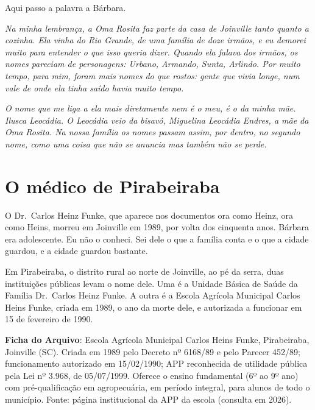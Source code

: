 \documentclass[
  brazilian,
  11pt,
  openany]{book}
\begin{document}
Aqui passo a palavra a Bárbara.

\emph{Na minha lembrança, a Oma Rosita faz parte da casa de Joinville
tanto quanto a cozinha. Ela vinha do Rio Grande, de uma família de doze
irmãos, e eu demorei muito para entender o que isso queria dizer. Quando
ela falava dos irmãos, os nomes pareciam de personagens: Urbano,
Armando, Sunta, Arlindo. Por muito tempo, para mim, foram mais nomes do
que rostos: gente que vivia longe, num vale de onde ela tinha saído
havia muito tempo.}

\emph{O nome que me liga a ela mais diretamente nem é o meu, é o da
minha mãe. Ilusca Leocádia. O Leocádia veio da bisavó, Miguelina
Leocádia Endres, a mãe da Oma Rosita. Na nossa família os nomes passam
assim, por dentro, no segundo nome, como uma coisa que não se anuncia
mas também não se perde.}

\section{O médico de Pirabeiraba}\label{o-muxe9dico-de-pirabeiraba}

O Dr.~Carlos Heinz Funke, que aparece nos documentos ora como Heinz, ora
como Heins, morreu em Joinville em 1989, por volta dos cinquenta anos.
Bárbara era adolescente. Eu não o conheci. Sei dele o que a família
conta e o que a cidade guardou, e a cidade guardou bastante.

Em Pirabeiraba, o distrito rural ao norte de Joinville, ao pé da serra,
duas instituições públicas levam o nome dele. Uma é a Unidade Básica de
Saúde da Família Dr.~Carlos Heinz Funke. A outra é a Escola Agrícola
Municipal Carlos Heins Funke, criada em 1989, o ano da morte dele, e
autorizada a funcionar em 15 de fevereiro de 1990.

\begin{ficha}

\textbf{Ficha do Arquivo}: Escola Agrícola Municipal Carlos Heins Funke,
Pirabeiraba, Joinville (SC). Criada em 1989 pelo Decreto nº 6168/89 e
pelo Parecer 452/89; funcionamento autorizado em 15/02/1990; APP
reconhecida de utilidade pública pela Lei nº 3.968, de 05/07/1999.
Oferece o ensino fundamental (6º ao 9º ano) com pré-qualificação em
agropecuária, em período integral, para alunos de todo o município.
Fonte: página institucional da APP da escola (consulta em 2026).

\end{ficha}
\end{document}
